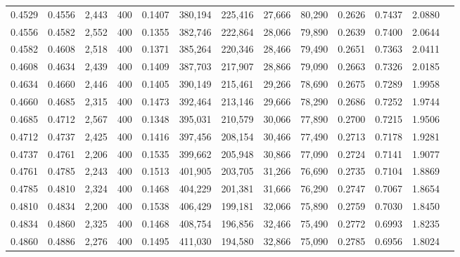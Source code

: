 \begin{tabular}{rrrrrrrrrrrrr}
0.4529 & 0.4556 &  2,443 & 400 &                                     0.1407 & 380,194 & 225,416 &  27,666 &  80,290 & 0.2626 & 0.7437 & 2.0880 \\
0.4556 & 0.4582 &  2,552 & 400 &                                     0.1355 & 382,746 & 222,864 &  28,066 &  79,890 & 0.2639 & 0.7400 & 2.0644 \\
0.4582 & 0.4608 &  2,518 & 400 &                                     0.1371 & 385,264 & 220,346 &  28,466 &  79,490 & 0.2651 & 0.7363 & 2.0411 \\
0.4608 & 0.4634 &  2,439 & 400 &                                     0.1409 & 387,703 & 217,907 &  28,866 &  79,090 & 0.2663 & 0.7326 & 2.0185 \\
0.4634 & 0.4660 &  2,446 & 400 &                                     0.1405 & 390,149 & 215,461 &  29,266 &  78,690 & 0.2675 & 0.7289 & 1.9958 \\
0.4660 & 0.4685 &  2,315 & 400 &                                     0.1473 & 392,464 & 213,146 &  29,666 &  78,290 & 0.2686 & 0.7252 & 1.9744 \\
0.4685 & 0.4712 &  2,567 & 400 &                                     0.1348 & 395,031 & 210,579 &  30,066 &  77,890 & 0.2700 & 0.7215 & 1.9506 \\
0.4712 & 0.4737 &  2,425 & 400 &                                     0.1416 & 397,456 & 208,154 &  30,466 &  77,490 & 0.2713 & 0.7178 & 1.9281 \\
0.4737 & 0.4761 &  2,206 & 400 &                                     0.1535 & 399,662 & 205,948 &  30,866 &  77,090 & 0.2724 & 0.7141 & 1.9077 \\
0.4761 & 0.4785 &  2,243 & 400 &                                     0.1513 & 401,905 & 203,705 &  31,266 &  76,690 & 0.2735 & 0.7104 & 1.8869 \\
0.4785 & 0.4810 &  2,324 & 400 &                                     0.1468 & 404,229 & 201,381 &  31,666 &  76,290 & 0.2747 & 0.7067 & 1.8654 \\
0.4810 & 0.4834 &  2,200 & 400 &                                     0.1538 & 406,429 & 199,181 &  32,066 &  75,890 & 0.2759 & 0.7030 & 1.8450 \\
0.4834 & 0.4860 &  2,325 & 400 &                                     0.1468 & 408,754 & 196,856 &  32,466 &  75,490 & 0.2772 & 0.6993 & 1.8235 \\
0.4860 & 0.4886 &  2,276 & 400 &                                     0.1495 & 411,030 & 194,580 &  32,866 &  75,090 & 0.2785 & 0.6956 & 1.8024 \\

\end{tabular}
